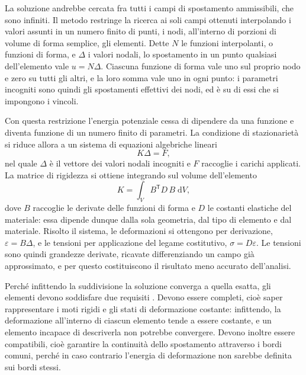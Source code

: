 La soluzione andrebbe cercata fra tutti i campi di spostamento ammissibili, che
sono infiniti. Il metodo restringe la ricerca ai soli campi ottenuti
interpolando i valori assunti in un numero finito di punti, i nodi, all'interno
di porzioni di volume di forma semplice, gli elementi. Dette $N$ le funzioni
interpolanti, o funzioni di forma, e $\Delta$ i valori nodali, lo spostamento in
un punto qualsiasi dell'elemento vale $u = N \Delta$. Ciascuna funzione di forma vale uno
sul proprio nodo e zero su tutti gli altri, e la loro somma vale uno in ogni
punto: i parametri incogniti sono quindi gli spostamenti effettivi dei nodi, ed
è su di essi che si impongono i vincoli.

Con questa restrizione l'energia potenziale cessa di dipendere da una funzione e
diventa funzione di un numero finito di parametri. La condizione di
stazionarietà si riduce allora a un sistema di equazioni algebriche lineari
\begin{equation}
    K \Delta = F ,
\end{equation}
nel quale $\Delta$ è il vettore dei valori nodali incogniti e $F$ raccoglie i
carichi applicati. La matrice di rigidezza si ottiene integrando sul volume
dell'elemento
\begin{equation}
    K = \int_V B^{\mathsf{T}} D\, B \; \mathrm{d}V ,
\end{equation}
dove $B$ raccoglie le derivate delle funzioni di forma e $D$ le costanti
elastiche del materiale: essa dipende dunque dalla sola geometria, dal tipo di
elemento e dal materiale. Risolto il sistema, le deformazioni si ottengono per
derivazione, $\varepsilon = B \Delta$, e le tensioni per
applicazione del legame costitutivo, $\sigma = D \varepsilon$. Le tensioni sono
quindi grandezze derivate, ricavate differenziando un campo già approssimato, e
per questo costituiscono il risultato meno accurato dell'analisi.

Perché infittendo la suddivisione la soluzione converga a quella esatta, gli
elementi devono soddisfare due requisiti \cite[cap.~11]{santi2024}. Devono
essere completi, cioè saper rappresentare i moti rigidi e gli stati di
deformazione costante: infittendo, la deformazione all'interno di ciascun
elemento tende a essere costante, e un elemento incapace di descriverla non
potrebbe convergere. Devono inoltre essere compatibili, cioè garantire la
continuità dello spostamento attraverso i bordi comuni, perché in caso contrario
l'energia di deformazione non sarebbe definita sui bordi stessi.

